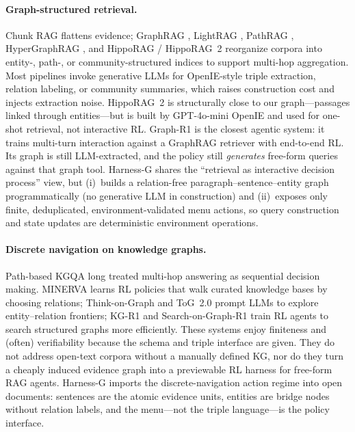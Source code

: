 \documentclass[letterpaper]{article} %
\begin{document}
\paragraph{Graph-structured retrieval.}
Chunk RAG \citep{lewis2020rag} flattens evidence; GraphRAG \citep{edge2024graphrag}, LightRAG \citep{guo2024lightrag}, PathRAG \citep{chen2025pathrag}, HyperGraphRAG \citep{luo2025hypergraphrag}, and HippoRAG / HippoRAG~2 \citep{gutierrez2024hipporag,gutierrez2025hipporag2} reorganize corpora into entity-, path-, or community-structured indices to support multi-hop aggregation.
Most pipelines invoke generative LLMs for OpenIE-style triple extraction, relation labeling, or community summaries, which raises construction cost and injects extraction noise.
HippoRAG~2 is structurally close to our graph---passages linked through entities---but is built by GPT-4o-mini OpenIE and used for one-shot retrieval, not interactive RL.
Graph-R1 \citep{luo2025graphr1} is the closest agentic system: it trains multi-turn interaction against a GraphRAG retriever with end-to-end RL.
Its graph is still LLM-extracted, and the policy still \emph{generates} free-form queries against that graph tool.
Harness-G shares the ``retrieval as interactive decision process'' view, but (i)~builds a relation-free paragraph--sentence--entity graph programmatically (no generative LLM in construction) and (ii)~exposes only finite, deduplicated, environment-validated menu actions, so query construction and state updates are deterministic environment operations.

\paragraph{Discrete navigation on knowledge graphs.}
Path-based KGQA long treated multi-hop answering as sequential decision making.
MINERVA \citep{das2018minerva} learns RL policies that walk curated knowledge bases by choosing relations; Think-on-Graph and ToG~2.0 \citep{sun2024tog,ma2024tog2} prompt LLMs to explore entity--relation frontiers; KG-R1 \citep{kgr12025} and Search-on-Graph-R1 \citep{sun2026sogr1} train RL agents to search structured graphs more efficiently.
These systems enjoy finiteness and (often) verifiability because the schema and triple interface are given.
They do not address open-text corpora without a manually defined KG, nor do they turn a cheaply induced evidence graph into a previewable RL harness for free-form RAG agents.
Harness-G imports the discrete-navigation action regime into open documents: sentences are the atomic evidence units, entities are bridge nodes without relation labels, and the menu---not the triple language---is the policy interface.
\end{document}
